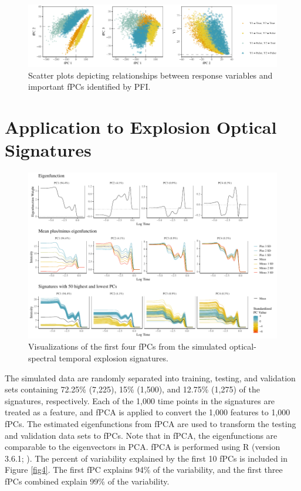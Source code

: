 \documentclass[letterpaper]{article}
\begin{document}
\begin{figure}[t]
\centering
\includegraphics[width=1.95\columnwidth]{fig5}
\caption{Scatter plots depicting relationships between response variables and important fPCs identified by PFI.}
\label{fig5}
\end{figure}

\section{Application to Explosion Optical Signatures} \label{application}

\begin{figure}[t]
\centering
\includegraphics[width=1.95\columnwidth]{fig6}
\caption{Visualizations of the first four fPCs from the simulated optical-spectral temporal explosion signatures.}
\label{fig6}
\end{figure}

The simulated data are randomly separated into training, testing, and validation sets containing 72.25\% (7,225), 15\% (1,500), and 12.75\% (1,275) of the signatures, respectively. Each of the 1,000 time points in the signatures are treated as a feature, and fPCA is applied to convert the 1,000 features to 1,000 fPCs. The estimated eigenfunctions from fPCA are used to transform the testing and validation data sets to fPCs. Note that in fPCA, the eigenfunctions are comparable to the eigenvectors in PCA. fPCA is performed using R (version 3.6.1; \citeauthor{r} \citeyear{r}). The percent of variability explained by the first 10 fPCs is included in Figure \ref{fig4}. The first fPC explains 94\% of the variability, and the first three fPCs combined explain 99\% of the variability.
\end{document}
